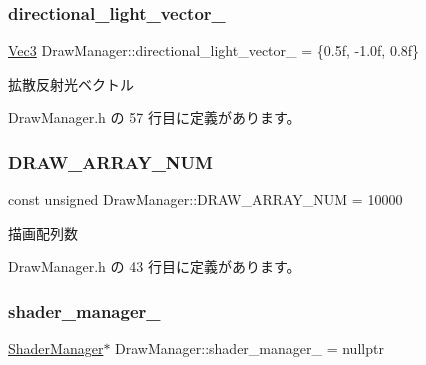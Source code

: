 \subsubsection{\texorpdfstring{directional\+\_\+light\+\_\+vector\+\_\+}{directional\_light\_vector\_}}
{\footnotesize\ttfamily \mbox{\hyperlink{_vector3_d_8h_ab16f59e4393f29a01ec8b9bbbabbe65d}{Vec3}} Draw\+Manager\+::directional\+\_\+light\+\_\+vector\+\_\+ = \{0.\+5f, -\/1.\+0f, 0.\+8f\}\hspace{0.3cm}{\ttfamily [private]}}



拡散反射光ベクトル 



 Draw\+Manager.\+h の 57 行目に定義があります。

\mbox{\label{class_draw_manager_ad4326cddcb1cc4cec198c4f8069b81f0}} 
\subsubsection{\texorpdfstring{D\+R\+A\+W\+\_\+\+A\+R\+R\+A\+Y\+\_\+\+N\+UM}{DRAW\_ARRAY\_NUM}}
{\footnotesize\ttfamily const unsigned Draw\+Manager\+::\+D\+R\+A\+W\+\_\+\+A\+R\+R\+A\+Y\+\_\+\+N\+UM = 10000\hspace{0.3cm}{\ttfamily [static]}}



描画配列数 



 Draw\+Manager.\+h の 43 行目に定義があります。

\mbox{\label{class_draw_manager_aac4cfc76f2953c30ed5eac54b544d0ad}} 
\subsubsection{\texorpdfstring{shader\+\_\+manager\+\_\+}{shader\_manager\_}}
{\footnotesize\ttfamily \mbox{\hyperlink{class_shader_manager}{Shader\+Manager}}$\ast$ Draw\+Manager\+::shader\+\_\+manager\+\_\+ = nullptr\hspace{0.3cm}{\ttfamily [private]}}



